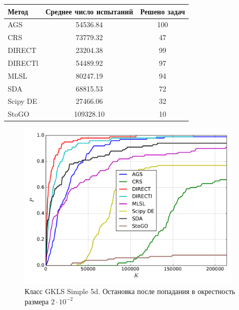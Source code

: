 \documentclass[a4paper]{article}
\begin{document}
\begin{tabular}{lcc}
\hline
 Метод    &  Среднее число испытаний  &  Решено задач  \\
\hline
 AGS      &         54536.84          &      100       \\
 CRS      &         73779.32          &       47       \\
 DIRECT   &         23204.38          &       99       \\
 DIRECTl  &         54489.92          &       97       \\
 MLSL     &         80247.19          &       94       \\
 SDA      &         68815.53          &       72       \\
 Scipy DE &         27466.06          &       32       \\
 StoGO    &         109328.10         &       10       \\
\hline
\end{tabular}
\begin{figure}[H]
  \center
  \includegraphics[width=0.95\textwidth]{../experiments/gklss5d/cmc.pdf}
  \caption{Класс GKLS Simple 5d. Остановка после попадания в окрестность размера $2\cdot10^{-2}$}
  \label{fig:}
\end{figure}
\end{document}
